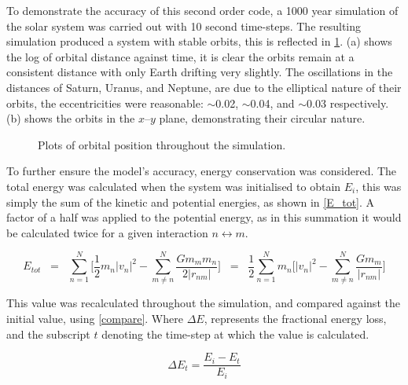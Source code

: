 \documentclass[a4paper,10pt]{article}
\begin{document}
To demonstrate the accuracy of this second order code, a 1000 year simulation of the solar system was carried out with 10 second time-steps. The resulting simulation produced a system with stable orbits, this is reflected in \cref{Distance}.  (a) shows the log of orbital distance against time, it is clear the orbits remain at a consistent distance with only Earth drifting very slightly. The oscillations in the distances of Saturn, Uranus, and Neptune, are due to the elliptical nature of their orbits, the eccentricities were reasonable: $\sim$0.02, $\sim$0.04, and $\sim$0.03 respectively.  (b) shows the orbits in the $x$--$y$ plane, demonstrating their circular nature.

\begin{figure}[h!]
    \centering
    \qquad
    \caption{Plots of orbital position throughout the simulation.}%
    \label{Distance}%
\end{figure}

To further ensure the model's accuracy, energy conservation was considered. The total energy was calculated when the system was initialised to obtain $E_i$, this was simply the sum of the kinetic and potential energies, as shown in \cref{E_tot}. A factor of a half was applied to the potential energy, as in this summation it would be calculated twice for a given interaction $n \leftrightarrow m$. 

\begin{equation} \label{E_tot}
    E_{tot}  \;\; =  \;\;  \sum\limits_{n=1}^{N} \bigg[ \frac{1}{2}m_n\left|v_n\right|^2 - \sum\limits_{m\neq n}^{N}\frac{G m_m m_n}{2 \left|r_{nm}\right|}\bigg]  \;\; = \;\; \frac{1}{2} \sum\limits_{n=1}^{N}m_n \bigg[\left|v_n\right|^2 - \sum\limits_{m\neq n}^{N}\frac{G m_m}{\left|r_{nm}\right|}\bigg] 
 \end{equation}
 
 This value was recalculated throughout the simulation, and compared against the initial value, using \cref{compare}. Where $ \Delta E$, represents the fractional energy loss, and the subscript $t$ denoting the time-step at which the value is calculated.
 
 \begin{equation} \label{compare}
    \Delta E_t =  \frac{E_i - E_t}{E_i}
\end{equation}
\end{document}
